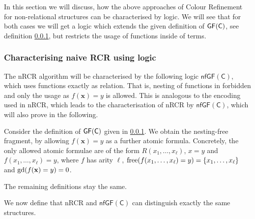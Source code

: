 In this section we will discuss, how the above approaches of Colour Refinement for non-relational structures can be characterised by logic.
We will see that for both cases we will get a logic which extends the given definition of $\mathsf{GF}(\mathsf{C})$, see definition \ref{}, but restricts the usage of functions inside of terms.

\subsubsection{Characterising naive RCR using logic} 

The nRCR algorithm will be characterised by the following logic $\mathsf{nfGF}(\mathsf C)$, which uses functions exactly as relation.
That is, nesting of functions in forbidden and only the usage as $f(\mathbf x)=y$ is allowed.
This is analogous to the encoding used in nRCR, which leads to the characterisation of nRCR by $\mathsf{nfGF}(\mathsf C)$, which will also prove in the following.

\begin{definition}
	Consider the definition of $\mathsf{GF}(\mathsf{C})$ given in \ref{}.
	We obtain the nesting-free fragment, by allowing $f(\mathbf x)=y$ as a further atomic formula.
	Concretely, the only allowed atomic formulae are of the form $R(x_1,\dots,x_\ell)$, $x=y$ and $f(x_1,\dots,x_\ell)=y$, where $f$ has arity $\ell$, $\operatorname{free}(f(x_1,\dots,x_\ell)=y)=\{x_1,\dots,x_\ell\}$ and $\operatorname{gd}(f(\mathbf x)=y)=0$.
	
	The remaining definitions stay the same.
\end{definition}

We now define that nRCR and $\mathsf{nfGF}(\mathsf C)$ can distinguish exactly the same structures.


